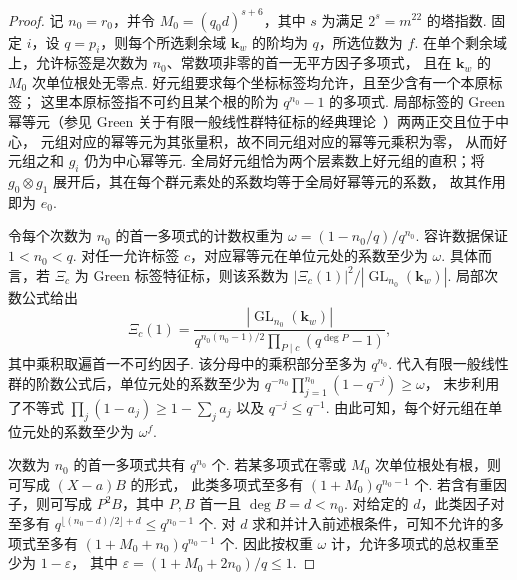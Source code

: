 \begin{proof}
记 $n_0=r_0$，并令 $M_0=(q_0d)^{s+6}$，其中 $s$ 为满足 $2^s=m^{22}$ 的塔指数.
固定 $i$，设 $q=p_i$，则每个所选剩余域 $\mathbf k_w$ 的阶均为 $q$，所选位数为 $f$.
在单个剩余域上，允许标签是次数为 $n_0$、常数项非零的首一无平方因子多项式，
且在 $\mathbf k_w$ 的 $M_0$ 次单位根处无零点.
好元组要求每个坐标标签均允许，且至少含有一个本原标签；
这里本原标签指不可约且某个根的阶为 $q^{n_0}-1$ 的多项式.
局部标签的 Green 幂等元（参见 Green 关于有限一般线性群特征标的经典理论~\cite{Green1955}）两两正交且位于中心，
元组对应的幂等元为其张量积，故不同元组对应的幂等元乘积为零，
从而好元组之和 $g_i$ 仍为中心幂等元.
全局好元组恰为两个层素数上好元组的直积；将 $g_0\otimes g_1$
展开后，其在每个群元素处的系数均等于全局好幂等元的系数，
故其作用即为 $e_0$.

令每个次数为 $n_0$ 的首一多项式的计数权重为
$\omega=(1-n_0/q)/q^{n_0}$. 容许数据保证 $1<n_0<q$.
对任一允许标签 $c$，对应幂等元在单位元处的系数至少为 $\omega$.
具体而言，若 $\Xi_c$ 为 Green 标签特征标，则该系数为
$|\Xi_c(1)|^2/|\operatorname{GL}_{n_0}(\mathbf k_w)|$.
局部次数公式给出
\[
 \Xi_c(1)=
 \frac{|\operatorname{GL}_{n_0}(\mathbf k_w)|}
      {q^{n_0(n_0-1)/2}\prod_{P\mid c}(q^{\deg P}-1)} ,
\]
其中乘积取遍首一不可约因子.
该分母中的乘积部分至多为 $q^{n_0}$.
代入有限一般线性群的阶数公式后，单位元处的系数至少为
$q^{-n_0}\prod_{j=1}^{n_0}(1-q^{-j})\ge\omega$，
末步利用了不等式 $\prod_j(1-a_j)\ge1-\sum_j a_j$ 以及 $q^{-j}\le q^{-1}$.
由此可知，每个好元组在单位元处的系数至少为 $\omega^f$.

次数为 $n_0$ 的首一多项式共有 $q^{n_0}$ 个.
若某多项式在零或 $M_0$ 次单位根处有根，则可写成 $(X-a)B$ 的形式，
此类多项式至多有 $(1+M_0)q^{n_0-1}$ 个.
若含有重因子，则可写成 $P^2B$，其中 $P,B$ 首一且 $\deg B=d<n_0$.
对给定的 $d$，此类因子对至多有
$q^{\lfloor(n_0-d)/2\rfloor+d}\le q^{n_0-1}$ 个.
对 $d$ 求和并计入前述根条件，可知不允许的多项式至多有
$(1+M_0+n_0)q^{n_0-1}$ 个.
因此按权重 $\omega$ 计，允许多项式的总权重至少为 $1-\varepsilon$，
其中 $\varepsilon=(1+M_0+2n_0)/q\le1$.


\end{proof}
